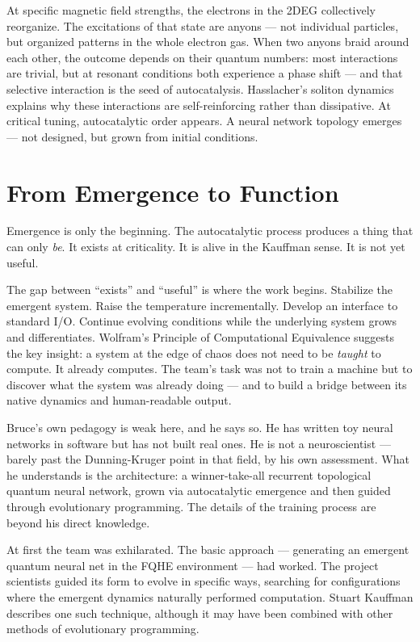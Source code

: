 At specific magnetic field strengths, the electrons in the 2DEG collectively reorganize. The excitations of that state are anyons --- not individual particles, but organized patterns in the whole electron gas. When two anyons braid around each other, the outcome depends on their quantum numbers: most interactions are trivial, but at resonant conditions both experience a phase shift --- and that selective interaction is the seed of autocatalysis. Hasslacher's soliton dynamics explains why these interactions are self-reinforcing rather than dissipative. At critical tuning, autocatalytic order appears. A neural network topology emerges --- not designed, but grown from initial conditions.

\section*{From Emergence to Function}
\label{record:demo-emergence-to-function}

Emergence is only the beginning. The autocatalytic process produces a thing that can only \textit{be}. It exists at criticality. It is alive in the Kauffman sense. It is not yet useful.

The gap between ``exists'' and ``useful'' is where the work begins. Stabilize the emergent system. Raise the temperature incrementally. Develop an interface to standard I/O\@. Continue evolving conditions while the underlying system grows and differentiates. Wolfram's Principle of Computational Equivalence suggests the key insight: a system at the edge of chaos does not need to be \textit{taught} to compute. It already computes. The team's task was not to train a machine but to discover what the system was already doing --- and to build a bridge between its native dynamics and human-readable output.

Bruce's own pedagogy is weak here, and he says so. He has written toy neural networks in software but has not built real ones. He is not a neuroscientist --- barely past the Dunning-Kruger point in that field, by his own assessment. What he understands is the architecture: a winner-take-all recurrent topological quantum neural network, grown via autocatalytic emergence and then guided through evolutionary programming. The details of the training process are beyond his direct knowledge.

At first the team was exhilarated. The basic approach --- generating an emergent quantum neural net in the FQHE environment --- had worked. The project scientists guided its form to evolve in specific ways, searching for configurations where the emergent dynamics naturally performed computation. Stuart Kauffman describes one such technique, although it may have been combined with other methods of evolutionary programming.

